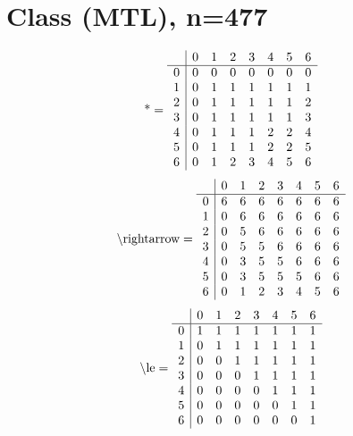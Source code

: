 \documentclass[11pt]{article}
\begin{document}
\section{Class (MTL), n=477}
\[\text{*} = 
\begin{array}{r | r r r r r r r}
 & 0 & 1 & 2 & 3 & 4 & 5 & 6 \\ \hline
0 & 0 & 0 & 0 & 0 & 0 & 0 & 0 \\
1 & 0 & 1 & 1 & 1 & 1 & 1 & 1 \\
2 & 0 & 1 & 1 & 1 & 1 & 1 & 2 \\
3 & 0 & 1 & 1 & 1 & 1 & 1 & 3 \\
4 & 0 & 1 & 1 & 1 & 2 & 2 & 4 \\
5 & 0 & 1 & 1 & 1 & 2 & 2 & 5 \\
6 & 0 & 1 & 2 & 3 & 4 & 5 & 6 \\
\end{array}
\]
\[\text{\textbackslash rightarrow} = 
\begin{array}{r | r r r r r r r}
 & 0 & 1 & 2 & 3 & 4 & 5 & 6 \\ \hline
0 & 6 & 6 & 6 & 6 & 6 & 6 & 6 \\
1 & 0 & 6 & 6 & 6 & 6 & 6 & 6 \\
2 & 0 & 5 & 6 & 6 & 6 & 6 & 6 \\
3 & 0 & 5 & 5 & 6 & 6 & 6 & 6 \\
4 & 0 & 3 & 5 & 5 & 6 & 6 & 6 \\
5 & 0 & 3 & 5 & 5 & 5 & 6 & 6 \\
6 & 0 & 1 & 2 & 3 & 4 & 5 & 6 \\
\end{array}
\]
\[\text{\textbackslash le} = 
\begin{array}{r | r r r r r r r}
 & 0 & 1 & 2 & 3 & 4 & 5 & 6 \\ \hline
0 & 1 & 1 & 1 & 1 & 1 & 1 & 1 \\
1 & 0 & 1 & 1 & 1 & 1 & 1 & 1 \\
2 & 0 & 0 & 1 & 1 & 1 & 1 & 1 \\
3 & 0 & 0 & 0 & 1 & 1 & 1 & 1 \\
4 & 0 & 0 & 0 & 0 & 1 & 1 & 1 \\
5 & 0 & 0 & 0 & 0 & 0 & 1 & 1 \\
6 & 0 & 0 & 0 & 0 & 0 & 0 & 1 \\
\end{array}
\]
\end{document}
